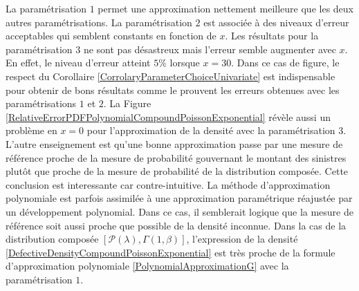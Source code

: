 La paramétrisation $1$ permet une approximation nettement meilleure que les deux autres paramétrisations. La paramétrisation $2$ est associée à des niveaux d\rq{}erreur acceptables qui semblent constants en fonction de $x$. Les résultats pour la paramétrisation $3$ ne sont pas désastreux mais l'erreur semble augmenter avec $x$. En effet, le niveau d'erreur atteint $5\%$ lorsque $x=30$. Dans ce cas de figure, le respect du Corollaire \ref{CorrolaryParameterChoiceUnivariate} est indispensable pour obtenir de bons résultats comme le prouvent les erreurs obtenues avec les paramétrisations $1$ et $2$. La Figure \ref{RelativeErrorPDFPolynomialCompoundPoissonExponential} révèle aussi un problème en $x=0$ pour l'approximation de la densité avec la paramétrisation $3$. L'autre enseignement est qu'une bonne approximation passe par une mesure de référence proche de la mesure de probabilité gouvernant le montant des sinistres plutôt que proche de la mesure de probabilité de la distribution composée. Cette conclusion est interessante car contre-intuitive. La méthode d'approximation polynomiale est parfois assimilée à une approximation paramétrique réajustée par un développement polynomial. Dans ce cas, il semblerait logique que la mesure de référence soit aussi proche que possible de la densité inconnue. Dans la cas de la distribution composée $\left[\mathcal{P}(\lambda),\Gamma(1,\beta)\right]$, l'expression de la densité \eqref{DefectiveDensityCompoundPoissonExponential} est très proche de la formule d'approximation polynomiale \eqref{PolynomialApproximationG} avec la paramétrisation $1$.\\ 

